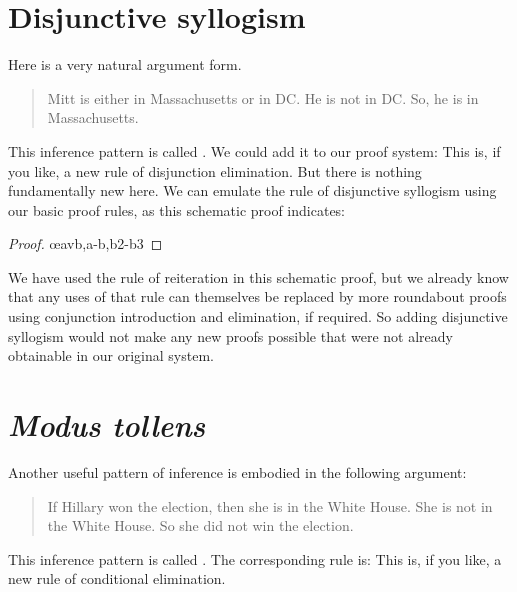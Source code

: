 \section{Disjunctive syllogism}
Here is a very natural argument form.
	\begin{quote}
		Mitt is either in Massachusetts or in DC. He is not in DC. So, he is in Massachusetts.
	\end{quote}
This inference pattern is called . We could add it to our proof system:
This is, if you like, a new rule of disjunction elimination.
But there is nothing fundamentally new here. We can emulate the rule of disjunctive syllogism using our basic proof rules, as this schematic proof indicates:
\begin{proof}
	\have[\ ]{}{\vdots}
	\open
		\open
			\close
		\close
		\open
		\close
	\oe{avb,a-b,b2-b3}
\end{proof}
We have used the rule of reiteration in this schematic proof, but we already know that any uses of that rule can themselves be replaced by more roundabout proofs using conjunction introduction and elimination, if required. So adding disjunctive syllogism would not make any new proofs possible that were not already obtainable in our original system.

\section{\emph{Modus tollens}}
Another useful pattern of inference is embodied in the following argument:
	\begin{quote}
		If Hillary won the election, then she is in the White House. She is not in the White House. So she did not win the election.
	\end{quote}
This inference pattern is called . The corresponding rule is:
This is, if you like, a new rule of conditional elimination.

